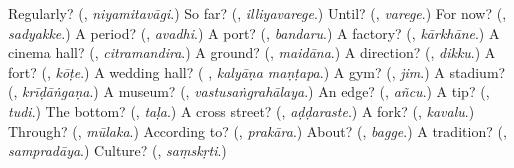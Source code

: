 \begin{tcolorbox}[breakable,colback=teal!4,colframe=teal!35!black,title={Before you move on}]
Regularly? (\textbf{}, \emph{niyamitavāgi}.) So far? (\textbf{}, \emph{illiyavarege}.) Until? (\textbf{}, \emph{varege}.) For now? (\textbf{}, \emph{sadyakke}.) A period? (\textbf{}, \emph{avadhi}.) A port? (\textbf{}, \emph{bandaru}.) A factory? (\textbf{}, \emph{kārkhāne}.) A cinema hall? (\textbf{}, \emph{citramandira}.) A ground? (\textbf{}, \emph{maidāna}.) A direction? (\textbf{}, \emph{dikku}.) A fort? (\textbf{}, \emph{kōṭe}.) A wedding hall? (\textbf{ }, \emph{kalyāṇa maṇṭapa}.) A gym? (\textbf{}, \emph{jim}.) A stadium? (\textbf{}, \emph{krīḍāṅgaṇa}.) A museum? (\textbf{}, \emph{vastusaṅgrahālaya}.) An edge? (\textbf{}, \emph{añcu}.) A tip? (\textbf{}, \emph{tudi}.) The bottom? (\textbf{}, \emph{taḷa}.) A cross street? (\textbf{}, \emph{aḍḍaraste}.) A fork? (\textbf{}, \emph{kavalu}.) Through? (\textbf{}, \emph{mūlaka}.) According to? (\textbf{}, \emph{prakāra}.) About? (\textbf{}, \emph{bagge}.) A tradition? (\textbf{}, \emph{sampradāya}.) Culture? (\textbf{}, \emph{saṃskṛti}.)
\end{tcolorbox}
